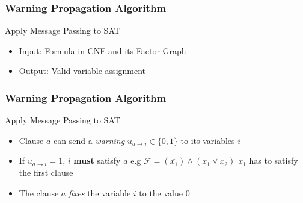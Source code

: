 
\begin{frame}
	\frametitle{Warning Propagation Algorithm}
	Apply Message Passing to SAT
	\begin{itemize}
	\item Input: Formula in CNF and its Factor Graph
	\item Output: Valid variable assignment \newline
	      
	\end{itemize}
\end{frame}

\begin{frame}
	\frametitle{Warning Propagation Algorithm}
	Apply Message Passing to SAT
	\begin{itemize}
		\item Clause $a$ can send a \emph{warning} $u_{a\rightarrow i} \in \{0, 1\}$ to its variables $i$
		\item If $u_{a \rightarrow i} = 1$, $i$ \textbf{must} satisfy $a$ \newline e.g $\mathcal{F} = (\overline{x_1}) \land (x_1 \lor x_2)$ \newline$x_1$ has to satisfy the first clause
	
\begin{figure}[h]
\centering

\end{figure}
\item The clause $a$ \emph{fixes} the variable $i$ to the value $0$
\end{itemize}
\end{frame}

